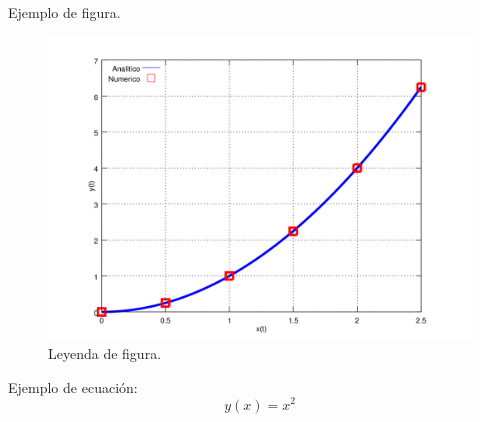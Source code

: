 Ejemplo de figura.

\begin{figure}[h!]
\label{fig:comp}
\includegraphics[width=.8\textwidth]{imagenes/chap4/x_vs_y}
\caption{Leyenda de figura.}
\end{figure}
Ejemplo de ecuación:
\begin{equation}
y(x)=x^2
\end{equation}
